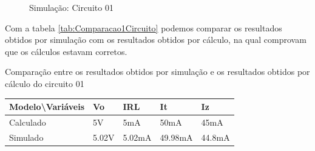 \begin{Resolucao}[H]
    \label{res:circuito01}
\end{Resolucao}

\begin{figure}[H]
    \centering
    \caption{Simulação: Circuito 01}
    \vspace{-0.3cm}
    \label{fig:SimulacaoCircuito01}
\end{figure}

Com a tabela \ref{tab:Comparacao1Circuito} podemos comparar os resultados obtidos por simulação com os resultados obtidos por cálculo, na qual comprovam que os cálculos estavam corretos.

\begin{quadro}[H]
    \centering
    \caption{Comparação entre os resultados obtidos por simulação e os resultados obtidos por cálculo do circuito 01}
    \begin{tabular}{|C{0.19\textwidth}|C{0.15\textwidth}|C{0.15\textwidth}|C{0.15\textwidth}|C{0.15\textwidth}|}
        \hline
        \textbf{Modelo\textbackslash{}Variáveis} & \textbf{Vo} & \textbf{IRL} & \textbf{It} & \textbf{Iz} \\
        \hline
        Calculado & 5V & 5mA & 50mA & 45mA \\
        \hline
        Simulado & 5.02V & 5.02mA & 49.98mA & 44.8mA \\
        \hline
    \end{tabular}
    \vspace{-0.6cm}
    \label{tab:Comparacao1Circuito}
\end{quadro}

